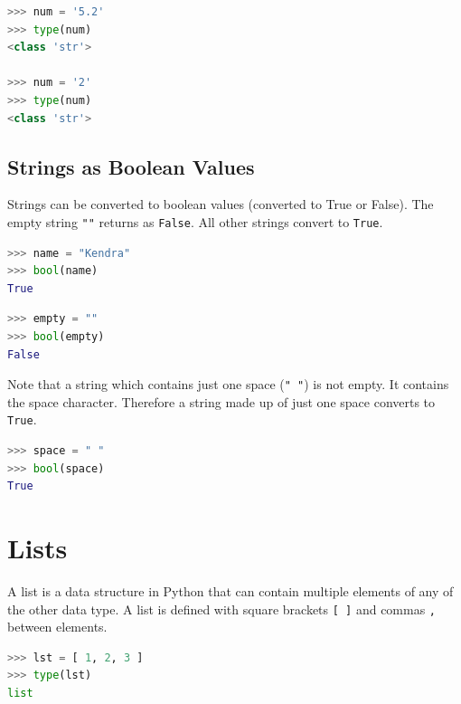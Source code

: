 \documentclass{book}
\begin{document}
\begin{lstlisting}[language=Python]
>>> num = '5.2'
>>> type(num)
<class 'str'>

>>> num = '2'
>>> type(num)
<class 'str'>
\end{lstlisting}
    




    
        \subsection{Strings as Boolean Values}\label{strings-as-boolean-values}

Strings can be converted to boolean values (converted to True or False).
The empty string \lstinline!""! returns as \lstinline!False!. All other
strings convert to \lstinline!True!.

\begin{lstlisting}[language=Python]
>>> name = "Kendra"
>>> bool(name)
True
\end{lstlisting}

\begin{lstlisting}[language=Python]
>>> empty = ""
>>> bool(empty)
False
\end{lstlisting}

Note that a string which contains just one space (\lstinline!" "!) is
not empty. It contains the space character. Therefore a string made up
of just one space converts to \lstinline!True!.

\begin{lstlisting}[language=Python]
>>> space = " "
>>> bool(space)
True
\end{lstlisting}
    




    
        \section{Lists}\label{lists}
    




    
        A list is a data structure in Python that can contain multiple elements
of any of the other data type. A list is defined with square brackets
\lstinline![ ]! and commas \lstinline!,! between elements.

\begin{lstlisting}[language=Python]
>>> lst = [ 1, 2, 3 ]
>>> type(lst)
list
\end{lstlisting}
\end{document}
